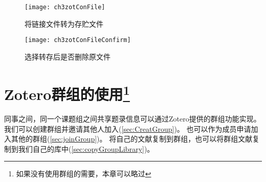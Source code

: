 \documentclass[cn,11pt,chinese]{elegantbook}
\begin{document}
	\begin{figure}[htbp]
		\centering
		\texttt{[image: ch3zotConFile]}
		\caption{将链接文件转为存贮文件}
		\label{fig:ch3zotConFile}
	\end{figure}

	\begin{figure}[htbp]
		\centering
		\texttt{[image: ch3zotConFileConfirm]}
		\caption{选择转存后是否删除原文件}
		\label{fig:ch3zotConFileConfirm}
	\end{figure}




  \chapter[Zotero群组的使用]{Zotero群组的使用\footnote{如果没有使用群组的需要，本章可以略过}}\label{ch:group}
	同事之间，同一个课题组之间共享题录信息可以通过Zotero提供的群组功能实现。
	我们可以创建群组并邀请其他人加入(\cref{sec:CreatGroup})。
	也可以作为成员申请加入其他的群组(\cref{sec:joinGroup})。
	将自己的文献复制到群组，也可以将群组文献复制到我们自己的库中(\cref{sec:copyGroupLibrary})。


   
\end{document}
